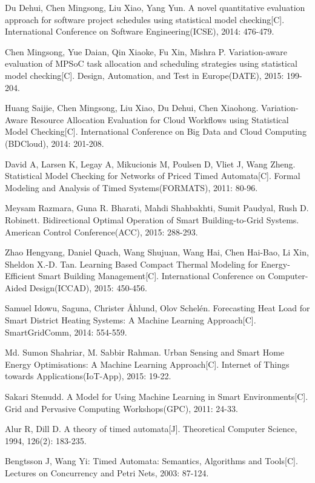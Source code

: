 \begin{thebibliography}{zz}
Du Dehui, Chen Mingsong, Liu Xiao, Yang Yun. A novel quantitative evaluation approach for software project schedules using statistical model checking[C]. International Conference on Software Engineering(ICSE), 2014: 476-479.

Chen Mingsong, Yue Daian, Qin Xiaoke, Fu Xin, Mishra P. Variation-aware evaluation of MPSoC task allocation and scheduling strategies using statistical model checking[C]. Design, Automation, and Test in Europe(DATE), 2015: 199-204.

Huang Saijie, Chen Mingsong, Liu Xiao, Du Dehui, Chen Xiaohong. Variation-Aware Resource Allocation Evaluation for Cloud Workflows using Statistical Model Checking[C]. International Conference on Big Data and Cloud Computing (BDCloud), 2014: 201-208.

David A, Larsen K, Legay A, Mikucionis M, Poulsen D, Vliet J, Wang Zheng. Statistical Model Checking for Networks of Priced Timed Automata[C]. Formal Modeling and Analysis of Timed Systems(FORMATS), 2011: 80-96.

Meysam Razmara, Guna R. Bharati, Mahdi Shahbakhti, Sumit Paudyal, Rush D. Robinett. Bidirectional Optimal Operation of Smart Building-to-Grid Systems. American Control Conference(ACC), 2015: 288-293.

Zhao Hengyang, Daniel Quach, Wang Shujuan, Wang Hai, Chen Hai-Bao, Li Xin, Sheldon X.-D. Tan. Learning Based Compact Thermal Modeling for Energy-Efficient Smart Building Management[C]. International Conference on Computer-Aided Design(ICCAD), 2015: 450-456.

Samuel Idowu, Saguna, Christer Åhlund, Olov Schelén. Forecasting Heat Load for Smart District Heating Systems: A Machine Learning Approach[C]. SmartGridComm, 2014: 554-559.

Md. Sumon Shahriar, M. Sabbir Rahman. Urban Sensing and Smart Home Energy Optimisations: A Machine Learning Approach[C]. Internet of Things towards Applications(IoT-App), 2015: 19-22.

Sakari Stenudd. A Model for Using Machine Learning in Smart Environments[C]. Grid and Pervasive Computing Workshops(GPC), 2011: 24-33.

Alur R, Dill D. A theory of timed automata[J]. Theoretical Computer Science, 1994, 126(2): 183-235.

Bengtsson J, Wang Yi: Timed Automata: Semantics, Algorithms and Tools[C]. Lectures on Concurrency and Petri Nets, 2003: 87-124.


\end{thebibliography}
